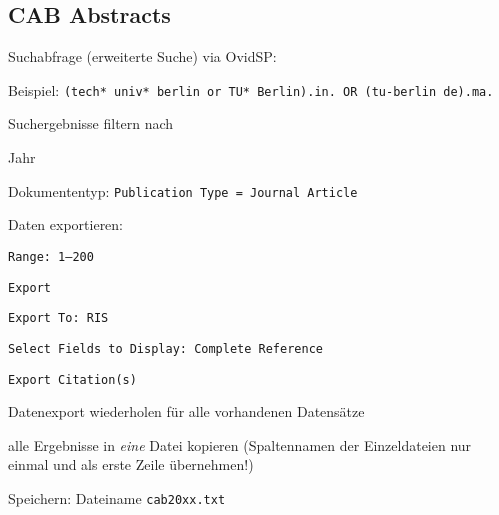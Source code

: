 \subsection*{CAB Abstracts}
\begin{compactitem}
\item Suchabfrage (erweiterte Suche) via OvidSP: 
	\begin{compactitem}
	\item Beispiel: \texttt{(tech* univ* berlin or TU* Berlin).in. OR (tu-berlin de).ma.}
	\end{compactitem}
\item Suchergebnisse filtern nach
	\begin{compactitem}
    \item Jahr
    \item Dokumententyp: \texttt{Publication Type = Journal Article}
    \end{compactitem}
\item Daten exportieren: 
	\begin{compactitem}
	\item \texttt{Range: 1--200}
    \item \texttt{Export}
    \item \texttt{Export To: RIS}
    \item \texttt{Select Fields to Display: Complete Reference}
    \item \texttt{Export Citation(s)}
	\end{compactitem}
\item Datenexport wiederholen für alle vorhandenen Datensätze
\item alle Ergebnisse in \textit{eine} Datei kopieren (Spaltennamen der Einzeldateien nur einmal und als erste Zeile übernehmen!)
\item Speichern: Dateiname \texttt{cab20xx.txt}
\end{compactitem}

